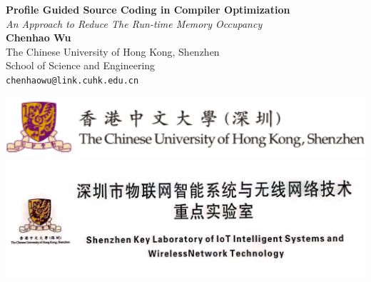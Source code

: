 \documentclass[a0,portrait]{a0poster}
\begin{document}


\begin{minipage}[b]{0.72\linewidth}
\Huge \color{NavyBlue} \textbf{Profile Guided Source Coding in Compiler Optimization} \color{Black}\\ %
\LARGE \textit{An Approach to Reduce The Run-time Memory Occupancy}\\[2cm] %
\LARGE \textbf{Chenhao Wu}\\[0.5cm] %
\LARGE The Chinese University of Hong Kong, Shenzhen\\School of Science and Engineering\\[0.4cm] %
\Large \texttt{chenhaowu@link.cuhk.edu.cn}\\
\end{minipage}
%
\begin{minipage}[b]{0.25\linewidth}
\includegraphics[width=20cm]{cuhksz.png}
\includegraphics[width=20cm]{iotlab}
\end{minipage}

\vspace{1cm} %

\end{document}
